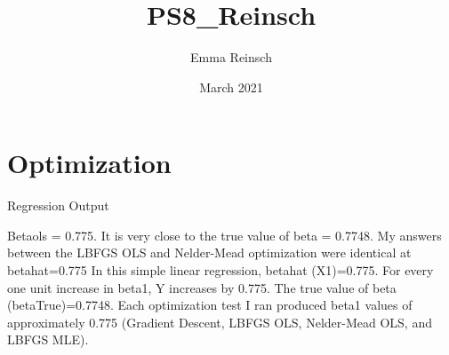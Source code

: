 \documentclass{article}
\title{PS8_Reinsch}
\author{Emma Reinsch}
\date{March 2021}
\begin{document}
\maketitle

\section{Optimization}
\item{Regression Output}


Betaols = 0.775. It is very close to the true value of beta = 0.7748.
My answers between the LBFGS OLS and Nelder-Mead optimization were identical at betahat=0.775
In this simple linear regression, betahat (X1)=0.775. For every one unit increase in beta1, Y increases by 0.775.
The true value of beta (betaTrue)=0.7748. Each optimization test I ran produced beta1 values of approximately 0.775 (Gradient Descent, LBFGS OLS, Nelder-Mead OLS, and LBFGS MLE). 
\end{document}
